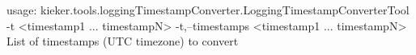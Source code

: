 usage: kieker.tools.loggingTimestampConverter.LoggingTimestampConverterTool -t
       <timestamp1 ... timestampN>
 -t,--timestamps <timestamp1 ... timestampN>   List of timestamps (UTC timezone)
                                               to convert
